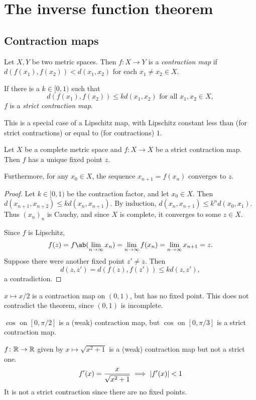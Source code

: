 \section{The inverse function theorem} \label{sec:ift}

\subsection{Contraction maps} \label{sec:contraction-maps}
\begin{definition*} \label{def:contract}
    Let $X, Y$ be two metric spaces.
    Then $f\colon X \to Y$ is a \emph{contraction map} if
    $d(f(x_1), f(x_2)) < d(x_1, x_2)$ for each $x_1 \ne x_2 \in X$.

    If there is a $k \in [0, 1)$ such that \[
        d(f(x_1), f(x_2)) \le k d(x_1, x_2) \text{ for all } x_1, x_2 \in X,
    \] $f$ is a \emph{strict contraction map}.
\end{definition*}
This is a special case of a Lipschitz map, with Lipschitz constant less
than (for strict contractions) or equal to (for contractions) $1$.

\begin{theorem*} \label{thm:banach}
    Let $X$ be a complete metric space and $f\colon X \to X$ be a
    strict contraction map.
    Then $f$ has a unique fixed point $z$.

    Furthermore, for any $x_0 \in X$, the sequence $x_{n+1} = f(x_n)$
    converges to $z$.
\end{theorem*}
\begin{proof}
    Let $k \in [0, 1)$ be the contraction factor, and let $x_0 \in X$.
    Then $d(x_{n+1}, x_{n+2}) \le k d(x_n, x_{n+1})$.
    By induction, $d(x_n, x_{n+1}) \le k^n d(x_0, x_1)$.
    Thus $(x_n)_n$ is Cauchy, and since $X$ is complete, it converges to
    some $z \in X$.

    Since $f$ is Lipschitz, \[
        f(z) = f\ab(\lim_{n \to \infty} x_n)
            = \lim_{n \to \infty} f(x_n)
            = \lim_{n \to \infty} x_{n+1}
            = z.
    \] Suppose there were another fixed point $z' \ne z$.
    Then \[
        d(z, z') = d(f(z), f(z')) \le k d(z, z'),
    \] a contradiction.
\end{proof}

\begin{examples}
    \item $x \mapsto x/2$ is a contraction map on $(0, 1)$, but has no fixed
    point.
    This does not contradict the theorem, since $(0, 1)$ is incomplete.
    \item $\cos$ on $[0, \pi/2]$ is a (weak) contraction map,
    but $\cos$ on $[0, \pi/3]$ is a strict contraction map.
    \item $f\colon \mathbb{R} \to \mathbb{R}$ given by $x \mapsto \sqrt{x^2 + 1}$ is a
    (weak) contraction map but not a strict one. \[
        f'(x) = \frac{x}{\sqrt{x^2 + 1}} \implies \lvert f'(x)\rvert < 1
    \] It is not a strict contraction since there are no fixed points.
\end{examples}

